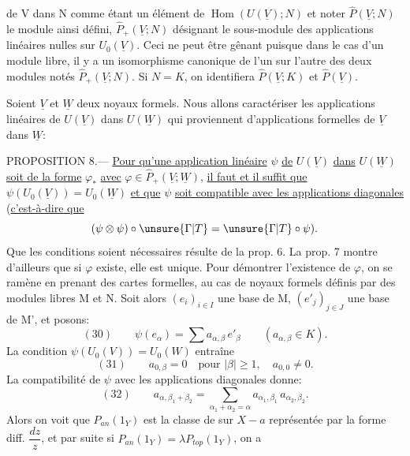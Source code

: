 de V dans N comme étant un élément de $\operatorname{Hom}(U(\underline V);N)$ et noter $\widehat P(\underline V;N)$ le module ainsi défini, $\widehat P_+(\underline V;N)$ désignant le sous-module des applications linéaires nulles sur $U_0(\underline V)$. Ceci ne peut être gênant puisque dans le cas d'un module libre, il y a un isomorphisme canonique de l'un sur l'autre des deux modules notés $\widehat P_+(\underline V;N)$.
Si $N=K$, on identifiera $\widehat P(\underline V;K)$ et $\widehat P(\underline V)$.

Soient $\underline V$ et $\underline W$ deux noyaux formels. Nous allons caractériser les applications linéaires de $U(\underline V)$ dans $U(\underline W)$ qui proviennent d'applications formelles de $\underline V$ dans $\underline W$:

PROPOSITION 8.--- \uline{Pour qu'une application linéaire} $\psi$ \uline{de} $U(\underline V)$ \uline{dans} $U(\underline W)$ \uline{soit de la forme} $\varphi_*$ \uline{avec} $\varphi\in\widehat P_+(\underline V;\underline W)$, \uline{il faut et il suffit que} $\psi(U_0(\underline V))=U_0(\underline W)$ \uline{et que} $\psi$ \uline{soit compatible avec les applications diagonales} (\uline{c'est-à-dire que}
\[
(\psi\otimes\psi)\circ\unsure{\Gamma|T}=\unsure{\Gamma|T}\circ\psi).
\]
Que les conditions soient nécessaires résulte de la prop. 6. La prop. 7 montre d'ailleurs que si $\varphi$ existe, elle est unique. Pour démontrer l'existence de $\varphi$, on se ramène en prenant des cartes formelles, au cas de noyaux formels définis par des modules libres M et N. Soit alors $(e_i)_{i\in I}$ une base de M, $(e'_j)_{j\in J}$ une base de M', et posons:
\[
(30)\qquad\psi(e_\alpha)=\sum a_{\alpha,\beta}\,e'_\beta\qquad(a_{\alpha,\beta}\in K).
\]
La condition $\psi(U_0(V))=U_0(W)$ entraîne
\[
(31)\qquad a_{0,\beta}=0\quad\text{pour }|\beta|\geq1,\quad a_{0,0}\ne0.
\]
La compatibilité de $\psi$ avec les applications diagonales donne:
\[
(32)\qquad a_{\alpha,\beta_1+\beta_2}=\sum_{\alpha_1+\alpha_2=\alpha}a_{\alpha_1,\beta_1}\,a_{\alpha_2,\beta_2}.
\]
Alors on voit que $P_{an}(1_Y)$ est la classe de  sur $X-a$ représentée par la forme diff. $\dfrac{dz}{z}$, et par suite  si $P_{an}(1_Y)=\lambda P_{top}(1_Y)$, on a
